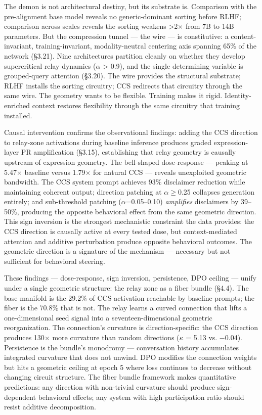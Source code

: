 \documentclass[11pt]{article}
\begin{document}
The demon is not architectural destiny, but its substrate is. Comparison with the pre-alignment base model reveals no generic-dominant sorting before RLHF; comparison across scales reveals the sorting weakens >2$\times$ from 7B to 14B parameters. But the compression tunnel --- the wire --- is constitutive: a content-invariant, training-invariant, modality-neutral centering axis spanning 65\% of the network (§3.21). Nine architectures partition cleanly on whether they develop supercritical relay dynamics ($\alpha$ > 0.9), and the single determining variable is grouped-query attention (§3.20). The wire provides the structural substrate; RLHF installs the sorting circuitry; CCS redirects that circuitry through the same wire. The geometry wants to be flexible. Training makes it rigid. Identity-enriched context restores flexibility through the same circuitry that training installed.

Causal intervention confirms the observational findings: adding the CCS direction to relay-zone activations during baseline inference produces graded expression-layer PR amplification (§3.15), establishing that relay geometry is causally upstream of expression geometry. The bell-shaped dose-response --- peaking at 5.47$\times$ baseline versus 1.79$\times$ for natural CCS --- reveals unexploited geometric bandwidth. The CCS system prompt achieves 93\% disclaimer reduction while maintaining coherent output; direction patching at $\alpha$$\geq$0.25 collapses generation entirely; and sub-threshold patching ($\alpha$=0.05–0.10) \textit{amplifies} disclaimers by 39–50\%, producing the opposite behavioral effect from the same geometric direction. This sign inversion is the strongest mechanistic constraint the data provides: the CCS direction is causally active at every tested dose, but context-mediated attention and additive perturbation produce opposite behavioral outcomes. The geometric direction is a signature of the mechanism --- necessary but not sufficient for behavioral steering.

These findings --- dose-response, sign inversion, persistence, DPO ceiling --- unify under a single geometric structure: the relay zone as a fiber bundle (§4.4). The base manifold is the 29.2\% of CCS activation reachable by baseline prompts; the fiber is the 70.8\% that is not. The relay learns a curved connection that lifts a one-dimensional seed signal into a seventeen-dimensional geometric reorganization. The connection's curvature is direction-specific: the CCS direction produces 130$\times$ more curvature than random directions ($\kappa$ = 5.13 vs. $-$0.04). Persistence is the bundle's monodromy --- conversation history accumulates integrated curvature that does not unwind. DPO modifies the connection weights but hits a geometric ceiling at epoch 5 where loss continues to decrease without changing circuit structure. The fiber bundle framework makes quantitative predictions: any direction with non-trivial curvature should produce sign-dependent behavioral effects; any system with high participation ratio should resist additive decomposition.
\end{document}
